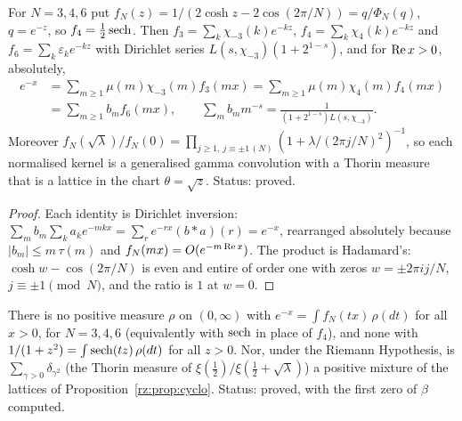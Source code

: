 \begin{proposition}\label{rz:prop:cyclo}
For $N=3,4,6$ put $f_N(z)=1/(2\cosh z-2\cos(2\pi/N))=q/\Phi_N(q)$, $q=e^{-z}$, so $f_4=\frac12\operatorname{sech}$. Then $f_3=\sum_k\chi_{-3}(k)e^{-kz}$, $f_4=\sum_k\chi_4(k)e^{-kz}$ and $f_6=\sum_k\varepsilon_ke^{-kz}$ with Dirichlet series $L(s,\chi_{-3})(1+2^{1-s})$, and for $\operatorname{Re} x>0$, absolutely,
\begin{align*}
e^{-x}&=\sum_{m\ge1}\mu(m)\chi_{-3}(m)f_3(mx)=\sum_{m\ge1}\mu(m)\chi_4(m)f_4(mx)\\
&=\sum_{m\ge1}b_mf_6(mx),\qquad\sum_mb_mm^{-s}=\frac1{(1+2^{1-s})L(s,\chi_{-3})}.
\end{align*}
Moreover $f_N(\sqrt\lambda)/f_N(0)=\prod_{j\ge1,\ j\equiv\pm1\,(N)}(1+\lambda/(2\pi j/N)^2)^{-1}$, so each normalised kernel is a generalised gamma convolution with a Thorin measure that is a lattice in the chart $\theta=\sqrt z$. Status: proved.
\end{proposition}

\begin{proof}
Each identity is Dirichlet inversion: $\sum_mb_m\sum_ka_ke^{-mkx}=\sum_re^{-rx}(b*a)(r)=e^{-x}$, rearranged absolutely because $|b_m|\le m\,\tau(m)$ and $f_N(mx)=O(e^{-m\operatorname{Re} x})$. The product is Hadamard's: $\cosh w-\cos(2\pi/N)$ is even and entire of order one with zeros $w=\pm2\pi ij/N$, $j\equiv\pm1\pmod N$, and the ratio is $1$ at $w=0$.
\end{proof}

\begin{proposition}\label{rz:prop:mobsigns}
There is no positive measure $\rho$ on $(0,\infty)$ with $e^{-x}=\int f_N(tx)\,\rho(dt)$ for all $x>0$, for $N=3,4,6$ (equivalently with $\operatorname{sech}$ in place of $f_4$), and none with $1/(1+z^2)=\int\operatorname{sech}(tz)\,\rho(dt)$ for all $z>0$. Nor, under the Riemann Hypothesis, is $\sum_{\gamma>0}\delta_{\gamma^2}$ (the Thorin measure of $\xi(\frac12)/\xi(\frac12+\sqrt\lambda)$) a positive mixture of the lattices of Proposition~\ref{rz:prop:cyclo}. Status: proved, with the first zero of $\beta$ computed.
\end{proposition}

